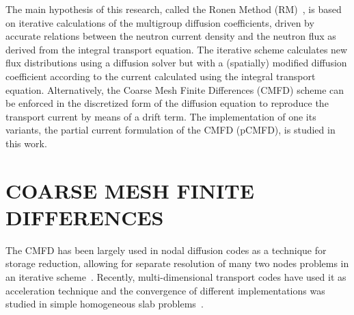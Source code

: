 \documentclass[letterpaper]{physor2020}
\begin{document}
The main hypothesis of this research, called the Ronen Method (RM)~\cite{Ronen-2004,Tomatis-2011}, is based on iterative calculations of the multigroup diffusion coefficients, driven by accurate relations between the neutron current density and the neutron flux as derived from the integral transport equation. The iterative scheme calculates new flux distributions using a diffusion solver but with a (spatially) modified diffusion coefficient according to the current calculated using the integral transport equation. Alternatively, the Coarse Mesh Finite Differences (CMFD) scheme can be enforced in the discretized form of the diffusion equation to reproduce the transport current by means of a drift term. The implementation of one its variants, the partial current formulation of the CMFD (pCMFD), is studied in this work.
%

\section{COARSE MESH FINITE DIFFERENCES}
\label{sec:CMFD-intro}

The CMFD has been largely used in nodal diffusion codes as a technique for storage reduction, allowing for separate resolution of many two nodes problems in an iterative scheme~\cite{Smith-1983,Lawrence-1986}. Recently, multi-dimensional transport codes have used it as acceleration technique and the convergence of different implementations was studied in simple homogeneous slab problems~\cite{Jarrett-2016,Shen-2019}.
\end{document}
